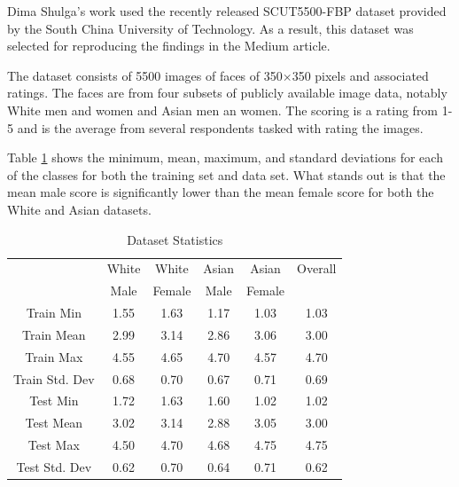 \documentclass{article}
\begin{document}
Dima Shulga's work \citep{shulga-medium} used the recently released SCUT5500-FBP \citep{scut5500} dataset provided by the South China University of Technology.  As a result, this dataset was selected for reproducing the findings in the Medium article.

The dataset consists of 5500 images of faces of 350$\times$350 pixels and associated ratings.  The faces are from four subsets of publicly available image data, notably White men and women and Asian men an women.  The scoring is a rating from 1-5 and is the average from several respondents tasked with rating the images.

Table \ref{statistics} shows the minimum, mean, maximum, and standard deviations for each of the classes for both the training set and data set.  What stands out is that the mean male score is significantly lower than the mean female score for both the White and Asian datasets.

\begin{table}[H]
    \centering
    \begin{tabular}{|c|c|c|c|c|c|}
        \hline
         & White & White & Asian & Asian & Overall \\
         & Male & Female & Male & Female & \\  \hline
         Train Min & 1.55 & 1.63 & 1.17 & 1.03 & 1.03 \\  \hline
         Train Mean & 2.99 & 3.14 & 2.86 & 3.06 & 3.00 \\  \hline
         Train Max & 4.55 & 4.65 & 4.70 & 4.57 & 4.70 \\  \hline
         Train Std. Dev & 0.68 & 0.70 & 0.67 & 0.71 & 0.69 \\ \hline
         Test Min & 1.72 & 1.63 & 1.60 & 1.02 & 1.02 \\ \hline
         Test Mean & 3.02 & 3.14 & 2.88 & 3.05 & 3.00 \\ \hline
         Test Max & 4.50 & 4.70 & 4.68 & 4.75 & 4.75 \\ \hline
         Test Std. Dev & 0.62 & 0.70 & 0.64 & 0.71 & 0.62 \\ \hline
    \end{tabular}
    \caption{Dataset Statistics}
    \label{statistics}
\end{table}
\end{document}
